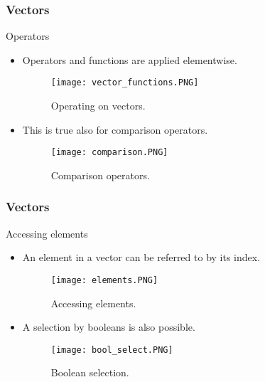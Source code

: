 \documentclass[main.tex]{subfiles}
\begin{document}
\begin{frame}
    \frametitle{Vectors}
\begin{block}{Operators}
   \begin{itemize}
    \item<+->Operators and functions are applied elementwise.
     \begin{figure}[htbp]
            \centering
           \texttt{[image: vector\_functions.PNG]} 
            \caption{Operating on vectors.}
            \label{fig:vect_op}
           \end{figure}
    \item<+-> This is true also for comparison operators.
     \begin{figure}[htbp]
            \centering
           \texttt{[image: comparison.PNG]}
            \caption{Comparison operators.}
            \label{fig:vect_comp}
           \end{figure}
   \end{itemize} 
\end{block}
\end{frame}
\begin{frame}
    \frametitle{Vectors}
    \begin{block}{Accessing elements}
        \begin{itemize}
            \item<+-> An element in a vector can be referred to by its 
            index.
     \begin{figure}[htbp]
            \centering
           \texttt{[image: elements.PNG]}
            \caption{Accessing elements.}
            \label{fig:vect_elts}
           \end{figure}
           \item<+-> A selection by booleans is also possible.
           \begin{figure}[htbp]
            \centering
           \texttt{[image: bool\_select.PNG]}
            \caption{Boolean selection.}
            \label{fig:vect_bool}
           \end{figure}
        \end{itemize}
    \end{block}
\end{frame}
\end{document}
